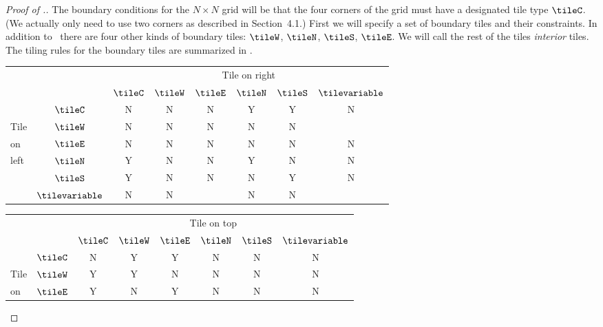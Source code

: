 \begin{proof}[Proof of .]

The boundary conditions for the $N \times N$ grid will be that the four corners of the grid must have a designated tile type $\tileC$.
(We actually only need to use two corners as described in Section~4.1.)
First we will specify a set of boundary tiles and their constraints.
In addition to \tileC\,
there are four other kinds of boundary tiles: $\tileW$, $\tileN$, $\tileS$, $\tileE$.
We will call the rest of the tiles \emph{interior} tiles.
The tiling rules for the boundary tiles are summarized in .
\begin{table}
\begin{centering}
\begin{tabular}{lc|cccccc}
     &             &                \multicolumn{6}{c}{Tile on right} \\
     &             & $\tileC$ & $\tileW$ & $\tileE$ & $\tileN$ & $\tileS$ & $\tilevariable$ \\
 \hline
     & $\tileC$    &     N    &    N     &    N     &     Y    &     Y    &    N   \\
Tile & $\tileW$    &     N    &    N     &    N     &     N    &     N    &        \\
on   & $\tileE$    &     N    &    N     &    N     &     N    &     N    &    N   \\
left & $\tileN$    &     Y    &    N     &    N     &     Y    &     N    &    N   \\
     & $\tileS$    &     Y    &    N     &    N     &     N    &     Y    &    N   \\
 & $\tilevariable$ &     N    &    N     &          &     N    &     N    &        \\
\end{tabular}
\qquad
\begin{tabular}{lc|cccccc}
       &             &                \multicolumn{6}{c}{Tile on top} \\
       &             & $\tileC$ & $\tileW$ & $\tileE$ & $\tileN$ & $\tileS$ & $\tilevariable$ \\
 \hline
       & $\tileC$    &     N    &    Y     &    Y     &     N    &     N    &    N   \\
Tile   & $\tileW$    &     Y    &    Y     &    N     &     N    &     N    &    N   \\
on     & $\tileE$    &     Y    &    N     &    Y     &     N    &     N    &    N   \\

\end{tabular}
\end{centering}
\end{table}
\end{proof}
